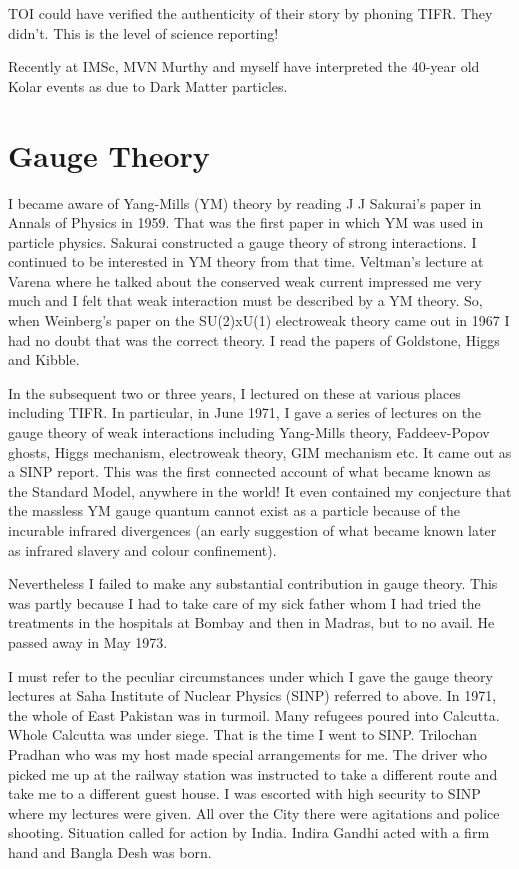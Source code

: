 TOI could have verified the authenticity of their story by phoning TIFR. 
They didn't. This is the level of science repor\-ting!

Recently at IMSc, MVN Murthy and myself have interpreted the 40-year old 
Kolar events as due to Dark Matter particles.
\newpage

\section*{Gauge Theory}

I became aware of Yang-Mills (YM) theory by reading J J Sakurai's paper 
in Annals of Physics in 1959. That was the first paper in which YM was 
used in particle physics. Sakurai constructed a gauge theory of strong 
interactions. I continued to be intere\-sted in YM theory from that time. 
Veltman's lecture at Varena where he talked about the conserved weak 
current impressed me very much and I felt that weak interaction must be 
described by a YM theory. So, when Weinberg's paper on the SU(2)xU(1) 
electroweak theory came out in 1967 I had no doubt that was the correct 
theory. I read the papers of Goldstone, Higgs and Kibble.

In the subsequent two or three years, I lectured on these at various 
places including TIFR. In particular, in June 1971, I gave a series of 
lectures on the gauge theory of weak interactions including Yang-Mills 
theory, Faddeev-Popov ghosts, Higgs mecha\-nism, electroweak theory, GIM 
mechanism etc. It came out as a SINP report. This was the first 
connected account of what became known as the Standard Model, anywhere 
in the world! It even contained my conjecture that the massless YM gauge 
quantum cannot exist as a particle because of the incurable infra\-red 
divergences (an early suggestion of what became known later as infrared 
slavery and colour confinement).

Nevertheless I failed to make any substantial contribution in gauge 
theory. This was partly because I had to take care of my sick father 
whom I had tried the treatments in the hospitals at Bombay and then in 
Madras, but to no avail. He passed away in May 1973.

I must refer to the peculiar circumstances under which I gave the gauge 
theory lectures at Saha Institute of Nuclear Physics (SINP) referred 
to above. In 1971, the whole of East Pakistan was in turmoil. Many 
refugees poured into Calcutta. Whole Calcutta was under siege. That is 
the time I went to SINP. Trilochan Pradhan who was my host made special 
arrangements for me. The driver who picked me up at the railway station 
was instructed to take a different route and take me to a different 
guest house. I was escorted with high security to SINP where my lectures 
were given. All over the City there were agitations and police shoo\-ting. 
Situation called for action by India. Indira Gandhi acted with a firm 
hand and Bangla Desh was born.
  

